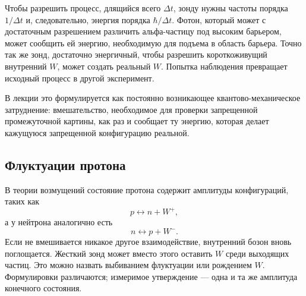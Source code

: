 Чтобы разрешить процесс, длящийся всего \(\Delta t\), зонду нужны частоты порядка \(1/\Delta t\) и, следовательно, энергия порядка \(\hbar/\Delta t\). Фотон, который может с достаточным разрешением различить альфа-частицу под высоким барьером, может сообщить ей энергию, необходимую для подъема в область барьера. Точно так же зонд, достаточно энергичный, чтобы разрешить короткоживущий внутренний \(W\), может создать реальный \(W\). Попытка наблюдения превращает исходный процесс в другой эксперимент.

В лекции это формулируется как постоянно возникающее квантово-механическое затруднение: вмешательство, необходимое для проверки запрещенной промежуточной картины, как раз и сообщает ту энергию, которая делает кажущуюся запрещенной конфигурацию реальной.

\subsection{Флуктуации протона}

В теории возмущений состояние протона содержит амплитуды конфигураций, таких как
\begin{equation}
  p\longleftrightarrow n+W^+,
\end{equation}
а у нейтрона аналогично есть
\begin{equation}
  n\longleftrightarrow p+W^-.
\end{equation}
Если не вмешивается никакое другое взаимодействие, внутренний бозон вновь поглощается. Жесткий зонд может вместо этого оставить \(W\) среди выходящих частиц. Это можно назвать выбиванием флуктуации или рождением \(W\). Формулировки различаются; измеримое утверждение — одна и та же амплитуда конечного состояния.

\begin{classroomqa}
\end{classroomqa}

